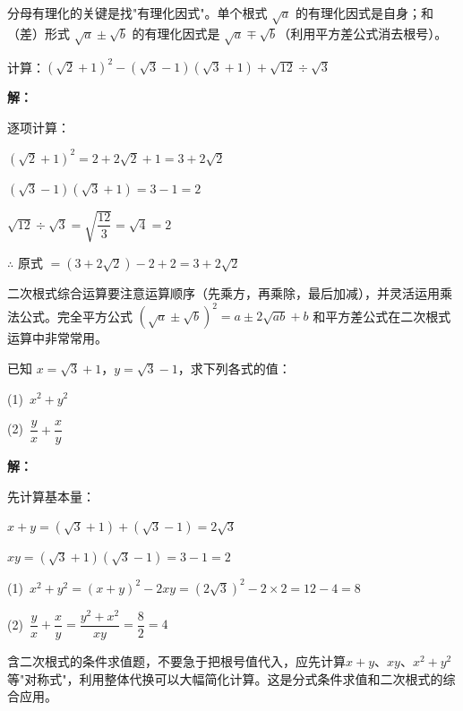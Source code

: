 \documentclass[12pt, a4paper]{ctexart}
\begin{document}
\begin{tipbox}[方法总结]
分母有理化的关键是找"有理化因式"。单个根式 $\sqrt{a}$ 的有理化因式是自身；和（差）形式 $\sqrt{a} \pm \sqrt{b}$ 的有理化因式是 $\sqrt{a} \mp \sqrt{b}$（利用平方差公式消去根号）。
\end{tipbox}

\begin{examplebox}[【例题6】二次根式的综合运算]
计算：$(\sqrt{2} + 1)^2 - (\sqrt{3} - 1)(\sqrt{3} + 1) + \sqrt{12} \div \sqrt{3}$

\bigskip
\textbf{解：}

逐项计算：

$(\sqrt{2}+1)^2 = 2 + 2\sqrt{2} + 1 = 3 + 2\sqrt{2}$

$(\sqrt{3}-1)(\sqrt{3}+1) = 3 - 1 = 2$

$\sqrt{12} \div \sqrt{3} = \sqrt{\dfrac{12}{3}} = \sqrt{4} = 2$

$\therefore$ 原式 $= (3 + 2\sqrt{2}) - 2 + 2 = 3 + 2\sqrt{2}$
\end{examplebox}

\begin{tipbox}[方法总结]
二次根式综合运算要注意运算顺序（先乘方，再乘除，最后加减），并灵活运用乘法公式。完全平方公式 $(\sqrt{a} \pm \sqrt{b})^2 = a \pm 2\sqrt{ab} + b$ 和平方差公式在二次根式运算中非常常用。
\end{tipbox}

\begin{examplebox}
已知 $x = \sqrt{3} + 1$，$y = \sqrt{3} - 1$，求下列各式的值：

\medskip
(1)\ $x^2 + y^2$

\medskip
(2)\ $\dfrac{y}{x} + \dfrac{x}{y}$

\bigskip
\textbf{解：}

先计算基本量：

$x + y = (\sqrt{3}+1) + (\sqrt{3}-1) = 2\sqrt{3}$

$xy = (\sqrt{3}+1)(\sqrt{3}-1) = 3 - 1 = 2$

\medskip
(1)\ $x^2 + y^2 = (x+y)^2 - 2xy = (2\sqrt{3})^2 - 2 \times 2 = 12 - 4 = 8$

\medskip
(2)\ $\dfrac{y}{x} + \dfrac{x}{y} = \dfrac{y^2 + x^2}{xy} = \dfrac{8}{2} = 4$
\end{examplebox}

\begin{tipbox}[方法总结]
含二次根式的条件求值题，不要急于把根号值代入，应先计算$x+y$、$xy$、$x^2+y^2$等"对称式"，利用整体代换可以大幅简化计算。这是分式条件求值和二次根式的综合应用。
\end{tipbox}
\end{document}
